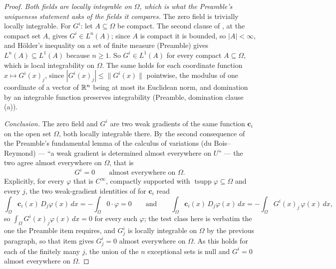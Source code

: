 \begin{proof}
\emph{Both fields are locally integrable on $\Omega$, which is what the
Preamble's uniqueness statement asks of the fields it compares.}  The zero field
is trivially locally integrable.  For $G^i$: let $A\subseteq\Omega$ be compact.
The second clause of , at the compact set $A$, gives
$G^i\in L^n(A)$; since $A$ is compact it is bounded, so $|A|<\infty$, and
H\"older's inequality on a set of finite measure (Preamble) gives
$L^n(A)\subseteq L^1(A)$ because $n\ge1$.  So $G^i\in L^1(A)$ for every compact
$A\subseteq\Omega$, which is local integrability on $\Omega$.  The same holds for
each coordinate function $x\mapsto G^i(x)_j$, since
$|G^i(x)_j|\le\|G^i(x)\|$ pointwise, the modulus of one coordinate of a vector of
$\mathbb{R}^n$ being at most its Euclidean norm, and domination by an integrable
function preserves integrability (Preamble, domination clause (a)).

\emph{Conclusion.}  The zero field and $G^i$ are two weak gradients of the same
function $\mathbf c_i$ on the open set $\Omega$, both locally integrable there.
By the second consequence of the Preamble's fundamental lemma of the calculus of
variations (du Bois--Reymond) --- ``a weak gradient is determined almost
everywhere on $U$'' --- the two agree almost everywhere on $\Omega$, that is
\[
G^i=0\qquad\text{almost everywhere on }\Omega .
\]
Explicitly, for every $\varphi$ that is $C^\infty$, compactly supported with
$\operatorname{tsupp}\varphi\subseteq\Omega$ and every $j$, the two
weak-gradient identities of  for $\mathbf c_i$ read
\[
\int_\Omega\mathbf c_i(x)\,D_j\varphi(x)\,dx=-\int_\Omega 0\cdot\varphi
=0
\qquad\text{and}\qquad
\int_\Omega\mathbf c_i(x)\,D_j\varphi(x)\,dx=-\int_\Omega G^i(x)_j\,\varphi(x)\,dx,
\]
so $\int_\Omega G^i(x)_j\varphi(x)\,dx=0$ for every such $\varphi$; the test
class here is verbatim the one the Preamble item requires, and $G^i_j$ is
locally integrable on $\Omega$ by the previous paragraph, so that item gives
$G^i_j=0$ almost everywhere on $\Omega$.  As this holds for each of the finitely
many $j$, the union of the $n$ exceptional sets is null and $G^i=0$ almost
everywhere on $\Omega$.
\end{proof}

